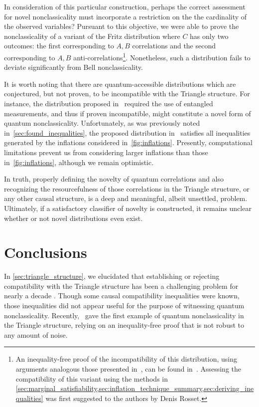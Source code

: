\documentclass[aps, 10pt, english, twoside, pra, nofootinbib, tightenlines, longbibliography, superscriptaddress]{revtex4-1}
\begin{document}
    In consideration of this particular construction, perhaps the correct assessment for novel nonclassicality must incorporate a restriction on the the cardinality of the observed variables? Pursuant to this objective, we were able to prove the nonclassicality of a variant of the Fritz distribution where $C$ has only two outcomes: the first corresponding to $A, B$ correlations and the second corresponding to $A, B$ anti-correlations\footnote{An inequality-free proof of the incompatibility of this distribution, using arguments analogous those presented in~\cite{Fritz_2012}, can be found in~\cite{Weilenmann_2016}. Assessing the compatibility of this variant using the methods in \cref{sec:marginal_satisfiability,sec:inflation_technique_summary,sec:deriving_inequalities} was first suggested to the authors by Denis Rosset.}. Nonetheless, such a distribution fails to deviate significantly from Bell nonclassicality.

    It is worth noting that there are quantum-accessible distributions which are conjectured, but not proven, to be incompatible with the Triangle structure. For instance, the distribution proposed in~\cite{Gisin_2017} required the use of entangled measurements, and thus if proven incompatible, might constitute a novel form of quantum nonclassicality. Unfortunately, as was previously noted in~\cref{sec:found_inequalities}, the proposed distribution in~\cite{Gisin_2017} satisfies all inequalities generated by the inflations considered in~\cref{fig:inflations}. Presently, computational limitations prevent us from considering larger inflations than those in~\cref{fig:inflations}, although we remain optimistic.

    In truth, properly defining the novelty of quantum correlations and also recognizing the resourcefulness of those correlations in the Triangle structure, or any other causal structure, is a deep and meaningful, albeit unsettled, problem. Ultimately, if a satisfactory classifier of novelty is constructed, it remains unclear whether or not novel distributions even exist.

    \section{Conclusions}
    \label{sec:conclusions}
    In \cref{sec:triangle_structure}, we elucidated that establishing or rejecting compatibility with the Triangle structure has been a challenging problem for nearly a decade \cite{Steudel_2010,Branciard_2012,Henson_2014,Fritz_2012,Gisin_2017}. Though some causal compatibility inequalities were known, those inequalities did not appear useful for the purpose of witnessing quantum nonclassicality. Recently,~\citet{Fritz_2012} gave the first example of quantum nonclassicality in the Triangle structure, relying on an inequality-free proof that is not robust to any amount of noise.
\end{document}
